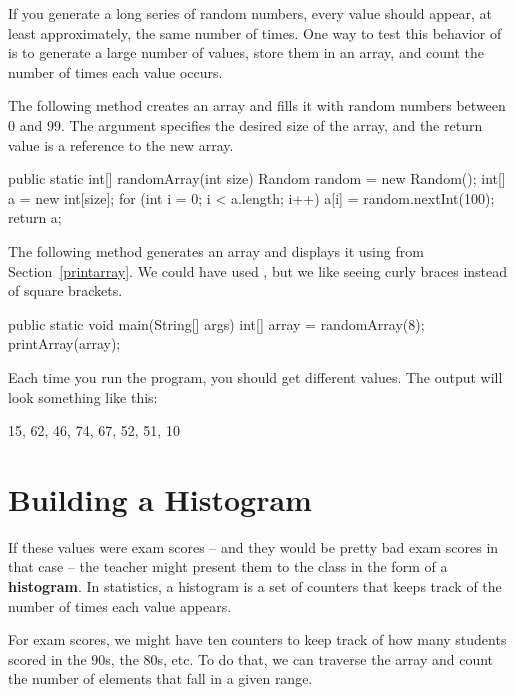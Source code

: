 If you generate a long series of random numbers, every value should appear, at least approximately, the same number of times.
One way to test this behavior of  is to generate a large number of values, store them in an array, and count the number of times each value occurs.

The following method creates an  array and fills it with random numbers between 0 and 99.
The argument specifies the desired size of the array, and the return value is a reference to the new array.

\begin{code}
public static int[] randomArray(int size) {
    Random random = new Random();
    int[] a = new int[size];
    for (int i = 0; i < a.length; i++) {
        a[i] = random.nextInt(100);
    }
    return a;
}
\end{code}

The following  method generates an array and displays it using  from Section~\ref{printarray}.
We could have used , but we like seeing curly braces instead of square brackets.

\begin{code}
public static void main(String[] args) {
    int[] array = randomArray(8);
    printArray(array);
}
\end{code}

Each time you run the program, you should get different values.
The output will look something like this:

\begin{stdout}
{15, 62, 46, 74, 67, 52, 51, 10}
\end{stdout}


\section{Building a Histogram}
\label{singlepass}


If these values were exam scores -- and they would be pretty bad exam scores in that case -- the teacher might present them to the class in the form of a {\bf histogram}.
In statistics, a histogram is a set of counters that keeps track of the number of times each value appears.

For exam scores, we might have ten counters to keep track of how many students scored in the 90s, the 80s, etc.
To do that, we can traverse the array and count the number of elements that fall in a given range.

